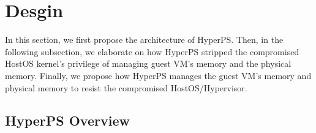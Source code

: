 \section{Desgin}%
\label{sec:desgin}

In this section, we first propose the architecture of HyperPS. Then, in the following subsection, we elaborate on how HyperPS stripped the compromised HostOS kernel's privilege of managing guest VM's memory and the physical memory. Finally, we propose how HyperPS manages the guest VM's memory and physical memory to resist the compromised HostOS/Hypervisor.


\subsection{HyperPS Overview}%
\label{sub:hyperps_overview}



